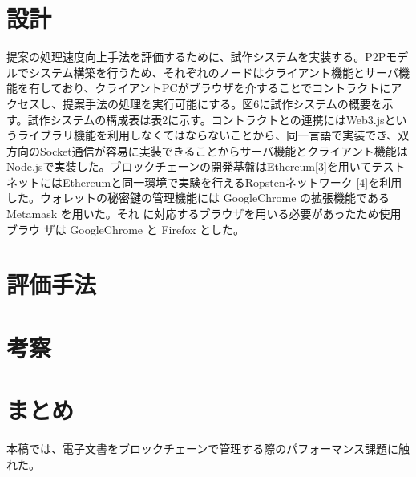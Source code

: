 \documentclass[10.5pt,a4paper,twocolumn]{jsarticle}
\begin{document}
\section{設計}
提案の処理速度向上手法を評価するために、試作システムを実装する。P2Pモデルでシステム構築を行うため、それぞれのノードはクライアント機能とサーバ機能を有しており、クライアントPCがブラウザを介することでコントラクトにアクセスし、提案手法の処理を実行可能にする。図6に試作システムの概要を示す。試作システムの構成表は表2に示す。コントラクトとの連携にはWeb3.jsというライブラリ機能を利用しなくてはならないことから、同一言語で実装でき、双方向のSocket通信が容易に実装できることからサーバ機能とクライアント機能はNode.jsで実装した。ブロックチェーンの開発基盤はEthereum[3]を用いてテストネットにはEthereumと同一環境で実験を行えるRopstenネットワーク [4]を利用した。ウォレットの秘密鍵の管理機能には GoogleChrome の拡張機能である Metamask を用いた。それ に対応するブラウザを用いる必要があったため使用ブラウ ザは GoogleChrome と Firefox とした。


\section{評価手法}

\section{考察}

\section{まとめ}
本稿では、電子文書をブロックチェーンで管理する際のパフォーマンス課題に触れた。
\end{document}
